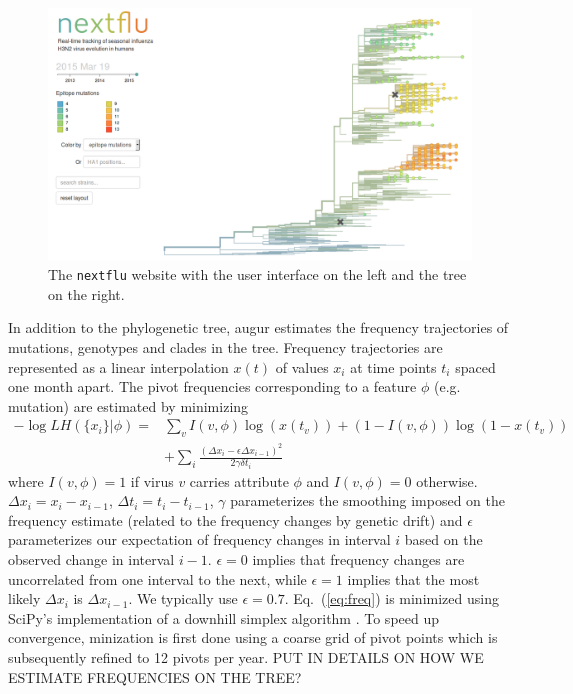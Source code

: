 \documentclass{bioinfo}
\newcommand{\EQ}[1]{Eq.~(\ref{eq:#1})}
\begin{document}
\begin{figure}[t!]
	\begin{center}
	\includegraphics[width=0.99\columnwidth]{figures/tree_screenshot}
\caption[]{The \texttt{nextflu} website with the user interface on the left and
the tree on the right.}
\label{fig:tree}
\end{center}
\end{figure}

In addition to the phylogenetic tree, augur estimates the frequency trajectories of mutations, genotypes and clades in the tree. 
Frequency trajectories are represented as a linear interpolation $x(t)$ of values $x_i$ at time points  $t_i$ spaced one month apart. 
The pivot frequencies corresponding to a feature $\phi$ (e.g. mutation) are estimated by minimizing
\begin{equation}
\label{eq:freq}
	\begin{split}
	-\log LH(\{x_i\} | \phi)  =& \sum_v I(v,\phi)\log(x(t_v)) + (1-I(v,\phi))\log(1-x(t_v)) \\
			&+\sum_i \frac{(\Delta x_i - \epsilon\Delta x_{i-1})^2}{2\gamma \delta t_i}
\end{split}
\end{equation}
where $I(v,\phi)=1$ if virus $v$ carries attribute $\phi$ and $I(v,\phi)=0$ otherwise.
$\Delta x_i = x_i-x_{i-1}$, $\Delta t_i = t_i-t_{i-1}$, $\gamma$ parameterizes the smoothing imposed on the frequency estimate (related to the frequency changes by genetic drift) and $\epsilon$ parameterizes our expectation of frequency changes in interval $i$ based on the observed change in interval $i-1$.
$\epsilon=0$ implies that frequency changes are uncorrelated from one interval to the next, while $\epsilon=1$ implies that
the most likely $\Delta x_i$ is $\Delta x_{i-1}$.
We typically use $\epsilon = 0.7$.
\EQ{freq} is minimized using SciPy's implementation of a downhill simplex algorithm \citep{Oliphant:2007p25672}.
To speed up convergence, minization is first done using a coarse grid of pivot points which is
subsequently refined to 12 pivots per year.
PUT IN DETAILS ON HOW WE ESTIMATE FREQUENCIES ON THE TREE?
\end{document}
